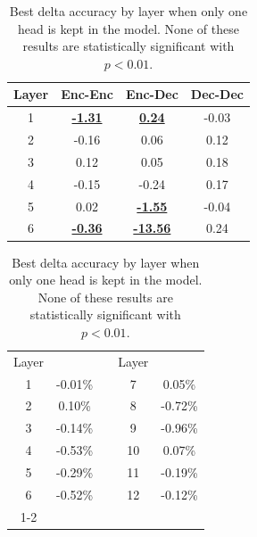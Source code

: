 \begin{table}[t!]
\begin{minipage}{0.45\textwidth}
\centering
\begin{tabular}{c|ccc}
Layer & Enc-Enc & Enc-Dec & Dec-Dec \\
\hline\hline
1 & \color{Maroon} \underline{\bf -1.31} & \color{NavyBlue} \underline{\bf 0.24} & \color{Maroon} -0.03 \\
2 & \color{Maroon} -0.16 & \color{NavyBlue} 0.06 & \color{NavyBlue} 0.12 \\
3 & \color{NavyBlue} 0.12 & \color{NavyBlue} 0.05 & \color{NavyBlue} 0.18 \\
4 & \color{Maroon} -0.15 & \color{Maroon} -0.24 & \color{NavyBlue} 0.17 \\
5 & \color{NavyBlue} 0.02 & \color{Maroon} \underline{\bf -1.55} & \color{Maroon} -0.04 \\
6 & \color{Maroon} \underline{\bf -0.36} & \color{Maroon} \underline{\bf -13.56} & \color{NavyBlue} 0.24 \\
\hline
\end{tabular}
\caption{\label{tab:tfwmt_ablation_all_but} Best delta BLEU by layer when only one head is kept in the \tfwmt{} model. Underlined numbers indicate that the change is statistically significant with $p<0.01$.}
\end{minipage}\hspace{1cm}
\begin{minipage}{0.45\textwidth}
\centering
\begin{tabular}{c|ccc|c}
Layer &  & & Layer &  \\
\hhline{==~==}
1 & \color{Maroon} -0.01\% & & 7 & \color{RoyalBlue} 0.05\% \\
2 & \color{RoyalBlue} 0.10\% & & 8 & \color{Maroon} -0.72\% \\
3 & \color{Maroon} -0.14\% & & 9 & \color{Maroon} -0.96\% \\
4 & \color{Maroon} -0.53\% & & 10 & \color{RoyalBlue} 0.07\% \\
5 & \color{Maroon} -0.29\% & & 11 & \color{Maroon} -0.19\% \\
6 & \color{Maroon} -0.52\% & & 12 & \color{Maroon} -0.12\% \\
\cline{1-2}\cline{4-5}
\end{tabular}
\caption{\label{tab:bertmnli_ablation_all_but} Best delta accuracy by layer when only one head is kept in the \bertmnli{} model. None of these results are statistically significant with $p<0.01$.}
\end{minipage}
\end{table}


